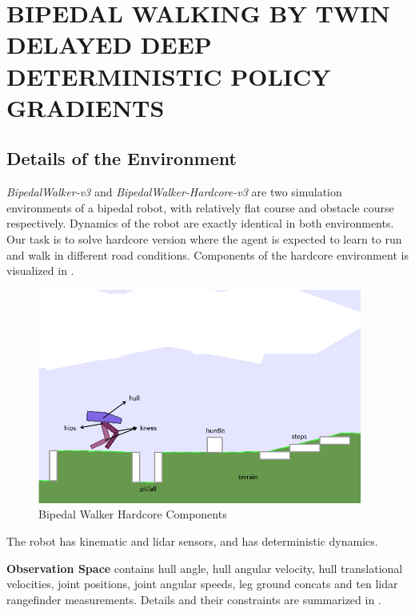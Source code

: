 \chapter{BIPEDAL WALKING BY TWIN DELAYED DEEP DETERMINISTIC POLICY GRADIENTS}
\label{chap:exp_setup}

\section{Details of the Environment}

\textit{BipedalWalker-v3} and \textit{BipedalWalker-Hardcore-v3} are two simulation environments of a bipedal robot, 
with relatively flat course and obstacle course respectively. 
Dynamics of the robot are exactly identical in both environments. 
Our task is to solve hardcore version where the agent is expected to learn to run and walk in different road conditions. 
Components of the hardcore environment is visualized in . 

\begin{figure}
	\centering
	\includegraphics[width=0.95\textwidth]{figures/bipedal/bpedal_annotated.png}
	\caption{Bipedal Walker Hardcore Components~\cite{noauthor_bipedalwalkerhardcore-v2_2021}}
	\label{fig:bipedal_hardcore_components}
\end{figure}

The robot has kinematic and lidar sensors, and has deterministic dynamics.

\textbf{Observation Space} contains hull angle, hull angular velocity, hull translational velocities, joint positions, joint angular speeds, leg ground concats and ten lidar rangefinder measurements. Details and their constraints are summarized in . 


